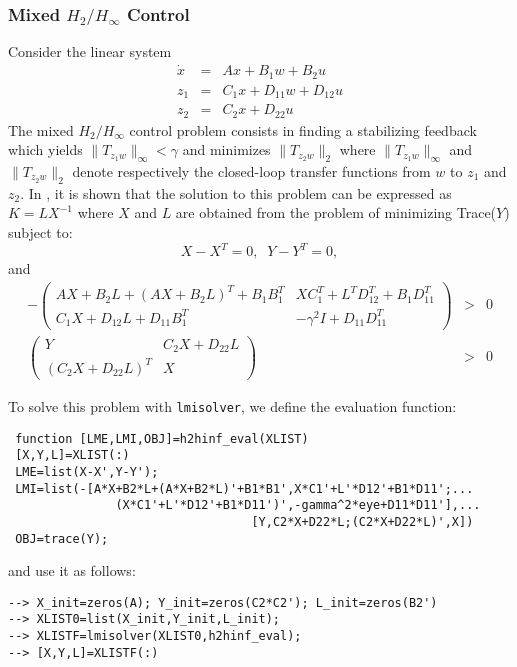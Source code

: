 \subsubsection{Mixed $H_2/H_{\infty}$ Control}
Consider the linear system
\begin{eqnarray*}
\dot{x}&=&Ax+B_1w+B_2u\\
z_1&=&C_1x+D_{11}w+D_{12}u\\
z_2&=&C_2x+D_{22}u
\end{eqnarray*}
The mixed $H_2/H_{\infty}$ control problem consists in finding
a stabilizing feedback which yields $\|T_{z_1w}\|_{\infty}<\gamma$ and
minimizes $\|T_{z_2w}\|_2$ where $\|T_{z_1w}\|_{\infty}$ and
$\|T_{z_2w}\|_2$ denote respectively the closed-loop transfer
functions from $w$ to $z_1$ and $z_2$. In \cite{khargo}, it is
shown that the solution to this problem can be expressed as
$K=LX^{-1}$ where $X$ and $L$ are obtained from the problem of
minimizing Trace($Y$) subject to:
\[
X-X^T=0,\;\; Y-Y^T=0,
\]
and
\begin{eqnarray*}
-\left( \begin{array} {cc}
AX+B_2L+(AX+B_2L)^T+B_1B_1^T & XC_1^T+L^TD_{12}^T+B_1D_{11}^T \\
C_1X+D_{12}L+D_{11}B_1^T & -\gamma^2 I + D_{11}D_{11}^T
\end{array} \right) & > & 0 \\
\left( \begin{array} {cc}Y & C_2X+D_{22}L\\(C_2X+D_{22}L)^T&X
\end{array} \right) & > & 0
\end{eqnarray*}

To solve this problem with {\tt lmisolver}, we define the 
evaluation function:
\begin{verbatim}
 function [LME,LMI,OBJ]=h2hinf_eval(XLIST)
 [X,Y,L]=XLIST(:)
 LME=list(X-X',Y-Y');
 LMI=list(-[A*X+B2*L+(A*X+B2*L)'+B1*B1',X*C1'+L'*D12'+B1*D11';...
               (X*C1'+L'*D12'+B1*D11')',-gamma^2*eye+D11*D11'],...
                                  [Y,C2*X+D22*L;(C2*X+D22*L)',X])
 OBJ=trace(Y);
\end{verbatim}
and use it as follows:
\begin{verbatim}
--> X_init=zeros(A); Y_init=zeros(C2*C2'); L_init=zeros(B2')
--> XLIST0=list(X_init,Y_init,L_init);
--> XLISTF=lmisolver(XLIST0,h2hinf_eval);
--> [X,Y,L]=XLISTF(:)
\end{verbatim}


